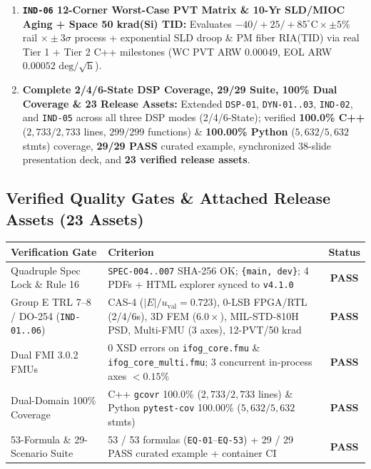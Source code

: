 \documentclass[11pt,a4paper]{article}
\newcommand{\DocVersion}{v4.1.0}
\begin{document}
\begin{enumerate}
    \item \textbf{\texttt{IND-06} 12-Corner Worst-Case PVT Matrix \& 10-Yr SLD/MIOC Aging + Space 50 krad(Si) TID:}
    Evaluates $-40/+25/+85^\circ\text{C} \times \pm 5\%$ rail $\times \pm 3\sigma$ process + exponential SLD droop \& PM fiber RIA(TID) via real Tier 1 + Tier 2 C++ milestones (WC PVT ARW $0.00049$, EOL ARW $0.00052\text{ deg}/\sqrt{\text{h}}$).
    \item \textbf{Complete 2/4/6-State DSP Coverage, 29/29 Suite, 100\% Dual Coverage \& 23 Release Assets:}
    Extended \texttt{DSP-01}, \texttt{DYN-01..03}, \texttt{IND-02}, and \texttt{IND-05} across all three DSP modes (2/4/6-State); verified \textbf{100.0\% C++} ($2{,}733/2{,}733$ lines, $299/299$ functions) \& \textbf{100.00\% Python} ($5{,}632/5{,}632$ stmts) coverage, \textbf{29/29 PASS} curated example, synchronized 38-slide presentation deck, and \textbf{23 verified release assets}.
\end{enumerate}

\subsection{Verified Quality Gates \& Attached Release Assets (23 Assets)}
\begin{tabularx}{\textwidth}{@{}l X c@{}}
\toprule
\textbf{Verification Gate} & \textbf{Criterion} & \textbf{Status} \\
\midrule
Quadruple Spec Lock \& Rule 16 & \texttt{SPEC-004..007} SHA-256 OK; \texttt{\{main, dev\}}; 4 PDFs + HTML explorer synced to \texttt{\DocVersion} & \textcolor{TealDark}{\textbf{PASS}} \\
Group E TRL 7--8 / DO-254 (\texttt{IND-01..06}) & CAS-4 ($|E|/u_{\text{val}}=0.723$), 0-LSB FPGA/RTL (2/4/6s), 3D FEM ($6.0\times$), MIL-STD-810H PSD, Multi-FMU (3 axes), 12-PVT/50 krad & \textcolor{TealDark}{\textbf{PASS}} \\
Dual FMI 3.0.2 FMUs & 0 XSD errors on \texttt{ifog\_core.fmu} \& \texttt{ifog\_core\_multi.fmu}; 3 concurrent in-process axes $<0.15\%$ & \textcolor{TealDark}{\textbf{PASS}} \\
Dual-Domain 100\% Coverage & C++ \texttt{gcovr} 100.0\% ($2{,}733/2{,}733$ lines) \& Python \texttt{pytest-cov} 100.00\% ($5{,}632/5{,}632$ stmts) & \textcolor{TealDark}{\textbf{PASS}} \\
53-Formula \& 29-Scenario Suite & 53 / 53 formulas (\texttt{EQ-01}--\texttt{EQ-53}) + 29 / 29 PASS curated example + container CI & \textcolor{TealDark}{\textbf{PASS}} \\
\bottomrule
\end{tabularx}
\end{document}
